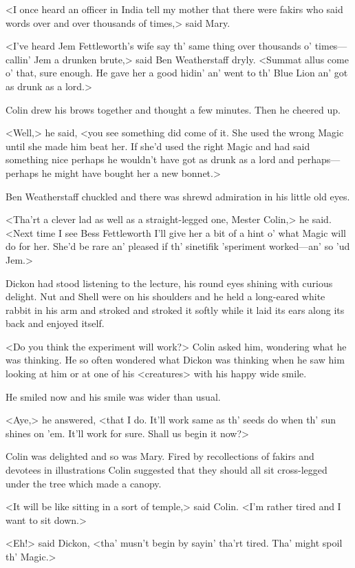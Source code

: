 <I once heard an officer in India tell my mother that there were fakirs who said words over and over thousands of times,> said Mary.

<I've heard Jem Fettleworth's wife say th' same thing over thousands o' times—callin' Jem a drunken brute,> said Ben Weatherstaff dryly. <Summat allus come o' that, sure enough. He gave her a good hidin' an' went to th' Blue Lion an' got as drunk as a lord.>

Colin drew his brows together and thought a few minutes. Then he cheered up.

<Well,> he said, <you see something did come of it. She used the wrong Magic until she made him beat her. If she'd used the right Magic and had said something nice perhaps he wouldn't have got as drunk as a lord and perhaps—perhaps he might have bought her a new bonnet.>

Ben Weatherstaff chuckled and there was shrewd admiration in his little old eyes.

<Tha'rt a clever lad as well as a straight-legged one, Mester Colin,> he said. <Next time I see Bess Fettleworth I'll give her a bit of a hint o' what Magic will do for her. She'd be rare an' pleased if th' sinetifik 'speriment worked—an' so 'ud Jem.>

Dickon had stood listening to the lecture, his round eyes shining with curious delight. Nut and Shell were on his shoulders and he held a long-eared white rabbit in his arm and stroked and stroked it softly while it laid its ears along its back and enjoyed itself.

<Do you think the experiment will work?> Colin asked him, wondering what he was thinking. He so often wondered what Dickon was thinking when he saw him looking at him or at one of his <creatures> with his happy wide smile.

He smiled now and his smile was wider than usual.

<Aye,> he answered, <that I do. It'll work same as th' seeds do when th' sun shines on 'em. It'll work for sure. Shall us begin it now?>

Colin was delighted and so was Mary. Fired by recollections of fakirs and devotees in illustrations Colin suggested that they should all sit cross-legged under the tree which made a canopy.

<It will be like sitting in a sort of temple,> said Colin. <I'm rather tired and I want to sit down.>

<Eh!> said Dickon, <tha' musn't begin by sayin' tha'rt tired. Tha' might spoil th' Magic.>

